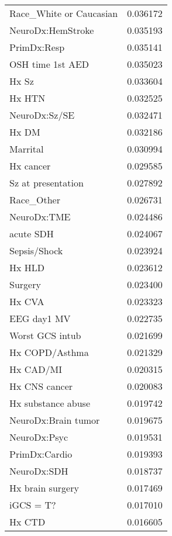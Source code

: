 \begin{tabular}{lr}
Race\_White or Caucasian        &  0.036172 \\
NeuroDx:HemStroke              &  0.035193 \\
PrimDx:Resp                    &  0.035141 \\
OSH time 1st AED               &  0.035023 \\
Hx Sz                          &  0.033604 \\
Hx HTN                         &  0.032525 \\
NeuroDx:Sz/SE                  &  0.032471 \\
Hx DM                          &  0.032186 \\
Marrital                       &  0.030994 \\
Hx cancer                      &  0.029585 \\
Sz at presentation             &  0.027892 \\
Race\_Other                     &  0.026731 \\
NeuroDx:TME                    &  0.024486 \\
acute SDH                      &  0.024067 \\
Sepsis/Shock                   &  0.023924 \\
Hx HLD                         &  0.023612 \\
Surgery                        &  0.023400 \\
Hx CVA                         &  0.023323 \\
EEG day1 MV                    &  0.022735 \\
Worst GCS intub                &  0.021699 \\
Hx COPD/Asthma                 &  0.021329 \\
Hx CAD/MI                      &  0.020315 \\
Hx CNS cancer                  &  0.020083 \\
Hx substance abuse             &  0.019742 \\
NeuroDx:Brain tumor            &  0.019675 \\
NeuroDx:Psyc                   &  0.019531 \\
PrimDx:Cardio                  &  0.019393 \\
NeuroDx:SDH                    &  0.018737 \\
Hx brain surgery               &  0.017469 \\
iGCS = T?                      &  0.017010 \\
Hx CTD                         &  0.016605 \\

\end{tabular}
